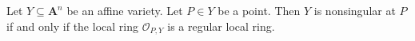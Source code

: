 Let $Y \subseteq \mathbf{A}^n$ be an affine variety. Let $P \in Y$ be a point. Then $Y$ is nonsingular at $P$ if and only if the local ring $\mathcal{O}_{P,Y}$ is a regular local ring.
